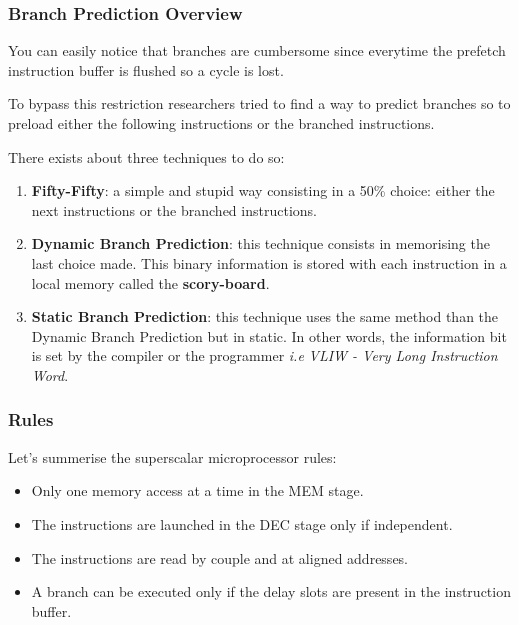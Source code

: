 \begin{frame}
  \frametitle{Branch Prediction Overview}

  You can easily notice that branches are cumbersome since everytime
  the prefetch instruction buffer is flushed so a cycle is lost.

  \-

  To bypass this restriction researchers tried to find a way to predict
  branches so to preload either the following instructions or the
  branched instructions.

  \-

  There exists about three techniques to do so:

  \begin{enumerate}
    \item
      \textbf{Fifty-Fifty}: a simple and stupid way consisting in a
      50\% choice: either the next instructions or the branched instructions.
    \item
      \textbf{Dynamic Branch Prediction}: this technique consists in
      memorising the last choice made. This binary information is stored
      with each instruction in a local memory called the \textbf{scory-board}.
    \item
      \textbf{Static Branch Prediction}: this technique uses the same
      method than the Dynamic Branch Prediction but in static. In other words,
      the information bit is set by the compiler or the programmer \textit{i.e}
      \textit{VLIW - Very Long Instruction Word}.
  \end{enumerate}
\end{frame}


\begin{frame}
  \frametitle{Rules}

  Let's summerise the superscalar microprocessor rules:

  \begin{itemize}
    \item
      Only one memory access at a time in the MEM stage.
    \item
      The instructions are launched in the DEC stage only if independent.
    \item
      The instructions are read by couple and at aligned addresses.
    \item
      A branch can be executed only if the delay slots are present in the
      instruction buffer.
  \end{itemize}
\end{frame}

